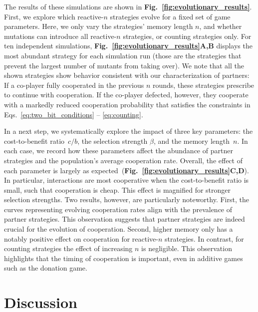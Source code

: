 \documentclass[11pt]{article}
\newcommand{\figref}[1]{{\textbf{Fig.~\ref{#1}}}}
\begin{document}
The results of these simulations are shown in \figref{fig:evolutionary_results}. 
First, we explore which reactive-$n$ strategies evolve for a fixed set of game parameters. 
Here, we only vary the strategies' memory length $n$, and whether mutations can introduce all reactive-$n$ strategies, or counting strategies only. 
For ten independent simulations, \figref{fig:evolutionary_results}\textbf{A,B} displays the most abundant strategy for each simulation run (those are the strategies that prevent the largest number of mutants from taking over). 
We note that all the shown strategies show behavior consistent with our characterization of partners: 
If a co-player fully cooperated in the previous $n$ rounds, these strategies prescribe to continue with cooperation. 
If the co-player defected, however, they cooperate with a markedly reduced cooperation probability that satisfies the constraints in Eqs.~\eqref{eq:two_bit_conditions} -- \eqref{eq:counting}. 

In a next step, we systematically explore the impact of three key parameters: the cost-to-benefit ratio~$c/b$, the selection strength $\beta$, and the memory length~$n$. 
In each case, we record how these parameters affect the abundance of partner strategies and the population's average cooperation rate. 
Overall, the effect of each parameter is largely as expected~(\figref{fig:evolutionary_results}\textbf{C,D}).  
In particular, interactions are most cooperative when the cost-to-benefit ratio is small, such that cooperation is cheap. 
This effect is magnified for stronger selection strengths. 
Two results, however, are particularly noteworthy. 
First, the curves representing evolving cooperation rates align with the prevalence of partner strategies. 
This observation suggests that partner strategies are indeed crucial for the evolution of cooperation. 
Second, higher memory only has a notably positive effect on cooperation for reactive-$n$ strategies. 
In contrast, for counting strategies the effect of increasing $n$ is negligible. 
This observation highlights that the timing of cooperation is important, even in additive games such as the donation game. 



\section*{Discussion}
\end{document}

